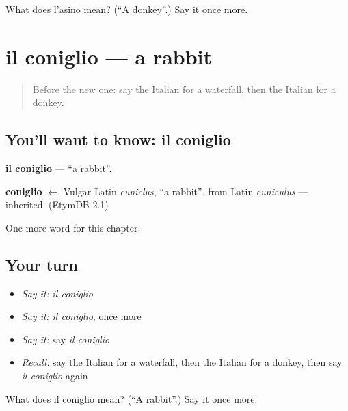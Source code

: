 \begin{tcolorbox}[breakable,colback=teal!4,colframe=teal!35!black,title={Before you move on}]
What does l'asino mean? (\textquotedblleft{}A donkey\textquotedblright{}.) Say it once more.
\end{tcolorbox}
\section[il coniglio]{il coniglio — a rabbit}

\label{lesson:IT-C120-coniglio}



\begin{quote}
Before the new one: say the Italian for a waterfall, then the Italian for a donkey.
\end{quote}

\subsection*{You'll want to know: il coniglio}
\textbf{il coniglio} — \textquotedblleft{}a rabbit\textquotedblright{}.

\begin{cousinweb}
\textbf{coniglio} $\leftarrow$ Vulgar Latin \emph{cuniclus}, \textquotedblleft{}a rabbit\textquotedblright{}, from Latin \emph{cuniculus} — inherited. (EtymDB 2.1)
\end{cousinweb}

\begin{grammarlens}[title={What you've built}]
One more word for this chapter.
\end{grammarlens}

\subsection*{Your turn}
\begin{itemize}
\raggedright
  \item \emph{Say it:} \emph{il coniglio}
  \item \emph{Say it:} \emph{il coniglio}, once more
  \item \emph{Say it:} say \emph{il coniglio}
  \item \emph{Recall:} say the Italian for a waterfall, then the Italian for a donkey, then say \emph{il coniglio} again
\end{itemize}

\begin{tcolorbox}[breakable,colback=teal!4,colframe=teal!35!black,title={Before you move on}]
What does il coniglio mean? (\textquotedblleft{}A rabbit\textquotedblright{}.) Say it once more.
\end{tcolorbox}
